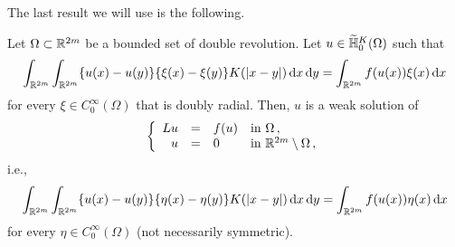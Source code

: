 The last result we will use is the following.

\begin{proposition}
	\label{Prop:WeakSolutionForAllTestFunctions}
	Let $\Omega \subset \mathbb{R}^{2m}$ be a bounded set of double revolution. Let $u\in \widetilde{\mathbb{H}}^K_{0}(\Omega)$ such that 
	$$
	\int_{\mathbb{R}^{2m}}\int_{\mathbb{R}^{2m}} \{u(x)-u(y)\}\{\xi(x)-\xi(y)\} K(|x-y|) \,\mathrm{d} x \,\mathrm{d} y = \int_{\mathbb{R}^{2m}} f(u(x)) \xi(x) \,\mathrm{d} x
	$$
	for every $\xi \in C^\infty_0(\Omega)$ that is doubly radial. Then, $u$ is a weak solution of
	$$
	\left\{\begin{array}{rcll}
	Lu &=& f(u) & \text{in } \Omega\,,\\
	u &=& 0 & \text{in } \mathbb{R}^{2m}\setminus \Omega\,,
	\end{array} \right.
	$$
	i.e., 
	$$
	\int_{\mathbb{R}^{2m}}\int_{\mathbb{R}^{2m}} \{u(x)-u(y)\}\{\eta(x)-\eta(y)\} K(|x-y|) \,\mathrm{d} x \,\mathrm{d} y = \int_{\mathbb{R}^{2m}} f(u(x)) \eta(x) \,\mathrm{d} x
	$$
	for every $\eta \in C^\infty_0(\Omega)$ (not necessarily symmetric).
\end{proposition}

